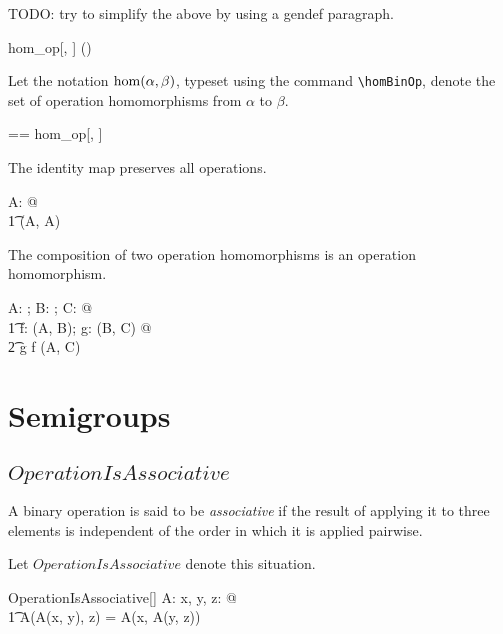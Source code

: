 \documentclass{amsart}
\begin{document}
TODO: try to simplify the above by using a gendef paragraph.

\begin{remark}
\begin{zed}
	hom\_op[\setT, \setU] \in \binop \setT \cross \binop \setU \fun \power (\setT \pfun \setU)
\end{zed}
\end{remark}

Let the notation $\operatorname{hom}(\alpha, \beta)$,  typeset using the command \verb|\homBinOp|, 
denote the set of operation homomorphisms from $\alpha$ to $\beta$.

\begin{zed}
	\homBinOp[\genT, \genU] == hom\_op[\genT, \genU]
\end{zed}

\begin{remark}
The identity map preserves all operations.
\begin{zed}
	\forall A: \binop \setX @ \\
	\t1	\id \setX \in \homBinOp(A, A)
\end{zed}
\end{remark}

\begin{remark}
The composition of two operation homomorphisms is an operation homomorphism.
\begin{zed}
	\forall A: \binop \setX; B: \binop \setY; C: \binop \setZ @ \\
	\t1	\forall f: \homBinOp(A, B); g: \homBinOp(B, C) @ \\
	\t2		g \circ f \in \homBinOp(A, C)
\end{zed}
\end{remark}

\section{Semigroups}

\subsection{$OperationIsAssociative$}

A binary operation is said to be \textit{associative} if the result of applying it to three elements
is independent of the order in which it is applied pairwise.

Let $OperationIsAssociative$ denote this situation.

\begin{schema}{OperationIsAssociative}[\genT]
A: \binop \genT
\where
	\forall x, y, z: \genT @ \\
	\t1		A(A(x, y), z) = A(x, A(y, z))
\end{schema}
\end{document}
